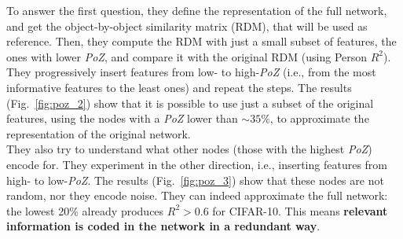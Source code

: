 To answer the first question, they define the representation of the full network, and get the object-by-object similarity matrix (RDM), that will be used as reference. Then, they compute the RDM with just a small subset of features, the ones with lower \textit{PoZ}, and compare it with the original RDM (using Person $R^2$). They progressively insert features from low- to high-\textit{PoZ} (i.e., from the most informative features to the least ones) and repeat the steps. The results (Fig.~\ref{fig:poz_2}) show that it is possible to use just a subset of the original features, using the nodes with a \textit{PoZ} lower than $\sim35\%$, to approximate the representation of the original network.\\

They also try to understand what other nodes (those with the highest \textit{PoZ}) encode for. They experiment in the other direction, i.e., inserting features from high- to low-\textit{PoZ}. The results (Fig.~\ref{fig:poz_3}) show that these nodes are not random, nor they encode noise. They can indeed approximate the full network: the lowest 20\% already produces $R^2>0.6$ for CIFAR-10. This means \textbf{relevant information is coded in the network in a redundant way}.


